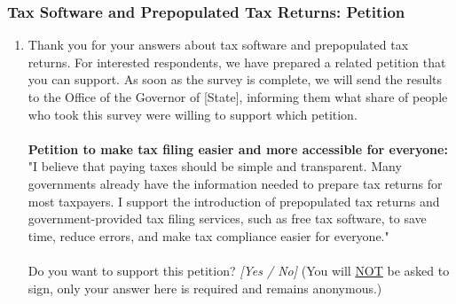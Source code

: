 \documentclass[11pt]{article}
\newcommand{\tk}[1]{\textcolor{orange}{#1}}
\begin{document}
\subsubsection*{Tax Software and Prepopulated Tax Returns: Petition} 
\begin{enumerate}[resume]
    \item Thank you for your answers about tax software and prepopulated tax returns. For interested respondents, we have prepared a related petition that you can support. As soon as the survey is complete, we will send the results to the Office of the Governor of [State], informing them what share of people who took this survey were willing to support which petition. \\ \\
    \textbf{Petition to make tax filing easier and more accessible for everyone:} "I believe that paying taxes should be simple and transparent. Many governments already have the information needed to prepare tax returns for most taxpayers. I support the introduction of prepopulated tax returns and government-provided tax filing services, such as free tax software, to save time, reduce errors, and make tax compliance easier for everyone."\\ \\
    Do you want to support this petition? \textit{[Yes / No]} (You will \underline{NOT} be asked to sign, only your answer here is required and remains anonymous.)
\end{enumerate}
\end{document}
